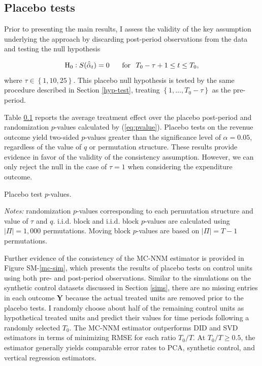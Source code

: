 \documentclass[12pt]{article}
\begin{document}
\subsection{Placebo tests} \label{placebo-tests}

Prior to presenting the main results, I assess the validity of the key assumption underlying the approach by discarding post-period observations from the data and testing the null hypothesis 

\begin{equation} \label{h0-placebo}
\text{H}_0: S (\hat{\bar{\alpha}}_{t}) = 0  \, \hspace{5mm} \,  \text{for} \, \hspace{2mm} T_0 - \tau +1 \leq t \leq T_0,
\end{equation}
\noindent
where $\tau \in \left\{1, 10, 25\right\}$. This placebo null hypothesis is tested by the same procedure described in Section \ref{hyp-test}, treating $\left\{1, \ldots, T_0 - \tau\right\}$ as the pre-period.

Table \ref{placebo-tests} reports the average treatment effect over the placebo post-period and randomization $p$-values calculated by (\ref{eq:pvalue}). Placebo tests on the revenue outcome yield two-sided $p$-values greater than the significance level of $\alpha = 0.05$, regardless of the value of $q$ or permutation structure. These results provide evidence in favor of the validity of the consistency assumption. However, we can only reject the null in the case of $\tau=1$ when considering the expenditure outcome. 

\begin{table}[htbp]
	\captionsetup{font=normalsize}
	\caption{Placebo test $p$-values.\label{placebo-tests}}
	\begin{center}
		\scalebox{.95}{}
	\end{center}
	\footnotesize{\emph{Notes:} randomization $p$-values corresponding to each permutation structure and value of $\tau$ and $q$. i.i.d. block and i.i.d. block $p$-values are calculated using $|\Pi| = 1,000$ permutations. Moving block $p$-values are based on $|\Pi| = T-1$ permutations.}
\end{table}

Further evidence of the consistency of the MC-NNM estimator is provided in Figure SM-\ref{mc-sim}, which presents the results of placebo tests on control units using both pre- and post-period observations. Similar to the simulations on the synthetic control datasets discussed in Section \ref{sims}, there are no missing entries in each outcome $\mathbf{Y}$ because the actual treated units are removed prior to the placebo tests. I randomly choose about half of the remaining control units as hypothetical treated units and predict their values for time periods following a randomly selected $T_0$. The MC-NNM estimator outperforms DID and SVD estimators in terms of minimizing RMSE for each ratio $T_0/T$. At $T_0/T \geq 0.5$, the estimator generally yields comparable error rates to PCA, synthetic control, and vertical regression estimators. 
\end{document}
